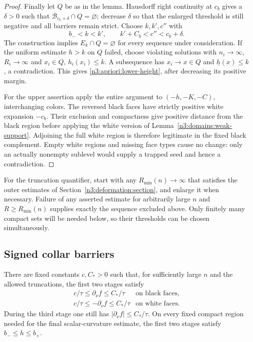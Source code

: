 \begin{proof}
Finally let $Q$ be as in the lemma.  Hausdorff right continuity at
$c_b$ gives a $\delta>0$ such that
$\mathcal B_{c_b+\delta}\cap Q=\varnothing$; decrease $\delta$ so
that the enlarged threshold is still negative and all barriers
remain strict.  Choose $k,k',c''$ with
\[
 b_-<k<k',\qquad k'+C_b<c''<c_b+\delta.
\]
The construction implies $E_k\cap Q=\varnothing$ for every sequence
under consideration.  If the uniform estimate $h>k$ on $Q$ failed,
choose violating solutions with $n_i\to\infty$, $R_i\to\infty$ and
$x_i\in Q$, $h_i(x_i)\le k$.  A subsequence has $x_i\to x\in Q$
and $\underline h(x)\le k$, a contradiction.  This gives
\eqref{n3:apriori:lower-height}, after decreasing its positive margin.

For the upper assertion apply the entire argument to
$(-h,-K,-C)$, interchanging colors.  The reversed black faces have
strictly positive white expansion $-c_b$.  Their exclusion and
compactness give positive distance from the black region before
applying the white version of Lemma~\ref{n3:domains:weak-support}.
Adjoining the full white region is therefore legitimate in the
fixed black complement.  Empty white regions and missing face types
cause no change: only an actually nonempty sublevel would supply a
trapped seed and hence a contradiction.
\end{proof}

For the truncation quantifier, start with any $R_{\min}(n)\to\infty$
that satisfies the outer estimates of
Section~\ref{n3:deformation:section}, and enlarge it when necessary.
Failure of any asserted estimate for arbitrarily large $n$ and
$R\ge R_{\min}(n)$ supplies exactly the sequence excluded above.
Only finitely many compact sets will be needed below, so their
thresholds can be chosen simultaneously.

\subsection{Signed collar barriers}

\begin{lemma}
\label{n3:apriori:collars}
There are fixed constants $c,C_*>0$ such that, for sufficiently large
$n$ and the allowed truncations, the first two stages satisfy
\begin{equation}
 \begin{array}{ll}
 c/\tau\le\partial_\nu f\le C_*/\tau&\text{on black faces},\\[2pt]
 c/\tau\le-\partial_\nu f\le C_*/\tau&\text{on white faces}.
 \end{array}
 \label{n3:apriori:signed-slopes}
\end{equation}
During the third stage one still has
$|\partial_\nu f|\le C_*/\tau$.  On every fixed compact region needed
for the final scalar-curvature estimate, the first two stages satisfy
$b_-\le h\le b_+$.
\end{lemma}


